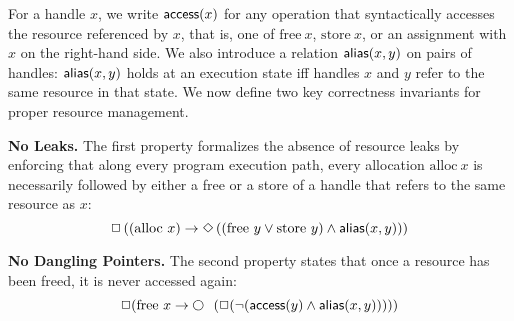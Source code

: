 For a handle $x$, we write ${\mathsf{access}}(x)$ for any operation that syntactically
accesses the resource referenced by $x$, that is, one of $\mathrm{free}\ x$,
$\mathrm{store}\ x$, or an assignment with $x$ on the right-hand side.
We also introduce a relation ${\mathsf{alias}}(x,y)$ on pairs of handles:
${\mathsf{alias}}(x,y)$ holds at an execution state
iff handles $x$ and $y$ refer to the same
resource in that state. 
We now define two key correctness invariants for proper resource
management. 

\smallskip
\noindent
{\bf No Leaks.} The first property formalizes the absence of resource
leaks by enforcing that along every program execution path, every allocation
$\mathrm{alloc}\ x$ is necessarily followed by either
a free or a store of a handle
that refers to the same resource as $x$:
\[
\Box \left( (\mathrm{alloc}\ x) \rightarrow
	\Diamond \left( (\mathrm{free}\ y 
                              \vee
                        \mathrm{store}\ y) \wedge {\mathsf{alias}}(x,y) 
                 \right) \right)
\]
%

\smallskip\noindent
{\bf No Dangling Pointers.} The second
property states that once a resource has
been freed, it is never accessed again:
\[
\Box ( \mathrm{free}\ x \rightarrow \Next (\Box (\lnot (\access(y) \wedge \alias(x,y))))) 
\]


